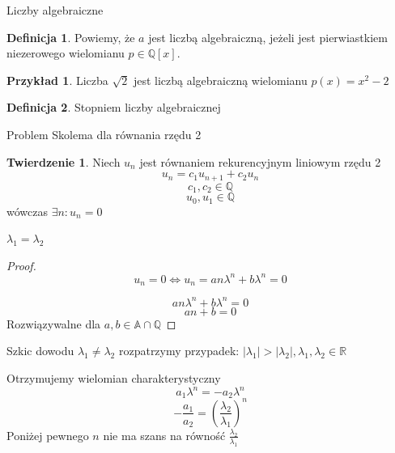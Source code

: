 \documentclass[handout]{beamer}
\def\Q{\mathbb{Q}}
\def\A{\mathbb{A}}
\theoremstyle{definition}
\newtheorem*{definicja}{Definicja}
\newtheorem*{twierdzenie}{Twierdzenie}
\newtheorem*{przyklad}{Przykład}
\theoremstyle{named}
\begin{document}
\begin{frame}{Liczby algebraiczne}
\begin{definicja}
    Powiemy, że $a $ jest liczbą algebraiczną, jeżeli jest pierwiastkiem niezerowego wielomianu $p \in \Q[x]$. 
\end{definicja}

\begin{przyklad}
    Liczba $\sqrt{2}$ jest liczbą algebraiczną wielomianu $p(x) = x^{2} - 2$
\end{przyklad}

\begin{definicja}
    Stopniem liczby algebraicznej 
\end{definicja}

\end{frame}


\begin{frame}{Problem Skolema dla równania rzędu 2}


\begin{twierdzenie}
    Niech $u_n$ jest równaniem rekurencyjnym liniowym rzędu 2
    $$
        u_n = c_1 u_{n+1} + c_2 u_n
    $$
    $$
        c_1, c_2 \in \mathbb{Q}
    $$
    $$
        u_0, u_1 \in \mathbb{Q}
    $$
    wówczas $\exists n : u_n = 0$
\end{twierdzenie}

\end{frame}

\begin{frame}{$\lambda_1= \lambda_2$}

\begin{proof}
    $$u_n = 0 \iff  u_n = a n \lambda^{n} + b \lambda^{n} = 0$$
    
    $$ a n \lambda^{n} + b \lambda^{n} = 0 $$
    $$ a n + b = 0 $$
    Rozwiązywalne dla $a, b \in \A \cap \Q $
\end{proof}

    
\end{frame}

\begin{frame}{Szkic dowodu $\lambda_1 \neq \lambda_2$}
    rozpatrzymy przypadek:
    $|\lambda_1| > |\lambda_2|, \lambda_1, \lambda_2 \in \mathbb{R}$
    
    Otrzymujemy wielomian charakterystyczny 
    $$
       a_1 \lambda^{n} = - a_2 \lambda^{n}
    $$
    $$
        - \frac{a_1}{a_2} = (\frac{\lambda_2}{\lambda_1})^{n}
    $$
    Poniżej pewnego $n$ nie ma szans na równość $\frac{\lambda_2}{\lambda_1}$
\end{frame}
\end{document}
